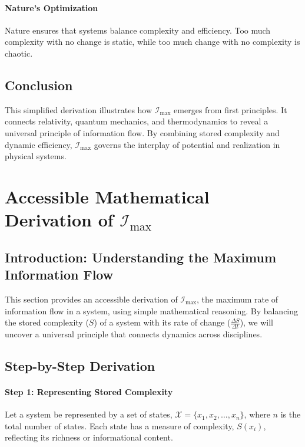 \documentclass[12pt]{article}
\begin{document}
\paragraph{Nature’s Optimization}
Nature ensures that systems balance complexity and efficiency. Too much complexity with no change is static, while too much change with no complexity is chaotic.

\subsection{Conclusion}
This simplified derivation illustrates how \(\mathcal{I}_{\text{max}}\) emerges from first principles. It connects relativity, quantum mechanics, and thermodynamics to reveal a universal principle of information flow. By combining stored complexity and dynamic efficiency, \(\mathcal{I}_{\text{max}}\) governs the interplay of potential and realization in physical systems.


\section{Accessible Mathematical Derivation of \(\mathcal{I}_{\text{max}}\)}

\subsection{Introduction: Understanding the Maximum Information Flow}
This section provides an accessible derivation of \(\mathcal{I}_{\text{max}}\), the maximum rate of information flow in a system, using simple mathematical reasoning. By balancing the stored complexity (\(S\)) of a system with its rate of change (\(\frac{\Delta S}{\Delta t}\)), we will uncover a universal principle that connects dynamics across disciplines.

\subsection{Step-by-Step Derivation}

\paragraph{Step 1: Representing Stored Complexity}
Let a system be represented by a set of states, \(\mathcal{X} = \{x_1, x_2, \ldots, x_n\}\), where \(n\) is the total number of states. Each state has a measure of complexity, \(S(x_i)\), reflecting its richness or informational content.
\end{document}
